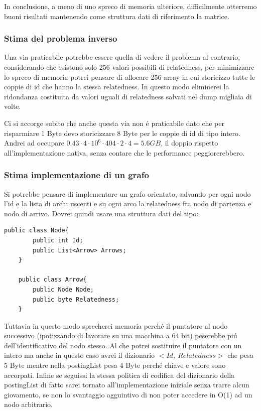 In conclusione, a meno di uno spreco di memoria ulteriore, difficilmente otterremo buoni risultati mantenendo come struttura dati di riferimento la matrice. 

\subsubsection{Stima del problema inverso}
Una via praticabile potrebbe essere quella di vedere il problema al contrario, considerando che esistono solo 256 valori possibili di relatedness, 
per minimizzare lo spreco di memoria potrei pensare di allocare 256 array in cui storicizzo tutte le coppie di id che hanno la stessa relatedness. 
In questo modo eliminerei la ridondanza costituita da valori uguali di relatedness salvati nel dump migliaia di volte.

Ci si accorge subito che anche questa via non \'e praticabile dato che per risparmiare 1 Byte devo storicizzare 8 Byte per le coppie di id di tipo intero. 
Andrei ad occupare $0.43 \cdot 4 \cdot 10^6 \cdot 404 \cdot 2 \cdot 4 = 5.6 GB$, il doppio rispetto all'implementazione nativa, senza contare che 
le performance peggiorerebbero.

\subsubsection{Stima implementazione di un grafo}
Si potrebbe pensare di implementare un grafo orientato, salvando per ogni nodo l'id e la lista di archi uscenti e su ogni arco la relatedness fra nodo di partenza 
e nodo di arrivo. Dovrei quindi usare una struttura dati del tipo:
 
\begin{lstlisting}[style=JavaStyle]
    public class Node{
        public int Id;
        public List<Arrow> Arrows;  
    }

    public class Arrow{
        public Node Node;
        public byte Relatedness;
    }
\end{lstlisting}

Tuttavia in questo modo sprecherei memoria perch\'e il puntatore al nodo successivo (ipotizzando di lavorare su una macchina a 64 bit) peserebbe pi\'u dell'identificativo 
del nodo stesso. Al che potrei sostituire il puntatore con un intero ma anche in questo caso avrei il dizionario $< Id,\ Relatedness >$ che pesa 5 Byte mentre nella 
postingList pesa 4 Byte perch\'e chiave e valore sono accorpati. Infine se seguissi la stessa politica di codifica del dizionario della postingList 
di fatto sarei tornato all'implementazione iniziale senza trarre alcun giovamento, se non lo svantaggio agguintivo di non poter accedere in O(1) ad un nodo arbitrario. 

